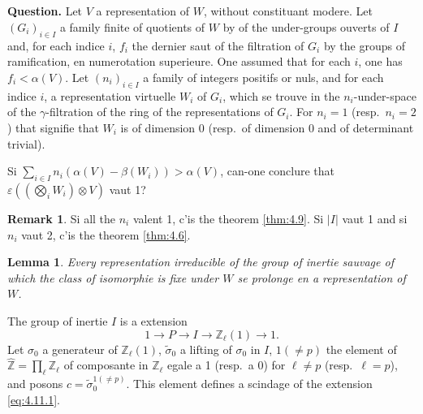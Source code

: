 \documentclass[12pt,a4paper]{article}
\theoremstyle{plain}
\newtheorem{lemma}[theorem]{Lemma}
\theoremstyle{definition}
\newtheorem{remark}[theorem]{Remark}
\theoremstyle{remark}
\newcommand{\bZ}{\mathbb{Z}}
\begin{document}
\subsection{}
\label{sec:4.10}

\textbf{Question.} Let $V$ a representation of $W$, without constituant modere. Let $(G_i)_{i \in I}$ a family finite of quotients of $W$ by of the under-groups ouverts of $I$ and, for each indice $i$, $f_i$ the dernier saut of the filtration of $G_i$ by the groups of ramification, en numerotation superieure. One assumed that for each $i$, one has $f_i < \alpha(V)$. Let $(n_i)_{i \in I}$ a family of integers positifs or nuls, and for each indice $i$, a representation virtuelle $W_i$ of $G_i$, which se trouve in the $n_i$-under-space of the $\gamma$-filtration of the ring of the representations of $G_i$. For $n_i = 1$ (resp.~$n_i = 2$) that signifie that $W_i$ is of dimension 0 (resp.~of dimension 0 and of determinant trivial).

Si $\sum_{i \in I} n_i(\alpha(V) - \beta(W_i)) > \alpha(V)$, can-one conclure that $\varepsilon((\bigotimes_i W_i) \otimes V)$ vaut 1?

\begin{remark}
Si all the $n_i$ valent 1, c'is the theorem \ref{thm:4.9}. Si $|I|$ vaut 1 and si $n_i$ vaut 2, c'is the theorem \ref{thm:4.6}.
\end{remark}

\begin{lemma}\label{lem:4.11}
Every representation irreducible of the group of inertie sauvage of which the class of isomorphie is fixe under $W$ se prolonge en a representation of $W$.
\end{lemma}

The group of inertie $I$ is a extension
\begin{equation}\label{eq:4.11.1}
1 \to P \to I \to \bZ_\ell(1) \to 1.
\end{equation}
Let $\sigma_0$ a generateur of $\bZ_\ell(1)$, $\tilde{\sigma}_0$ a lifting of $\sigma_0$ in $I$, $1(\neq p)$ the element of $\hat{\bZ} = \prod_\ell \bZ_\ell$ of composante in $\bZ_\ell$ egale a 1 (resp.~a 0) for $\ell \neq p$ (resp.~$\ell = p$), and posons $c = \tilde{\sigma}_0^{1(\neq p)}$. This element defines a scindage of the extension \eqref{eq:4.11.1}.
\end{document}
